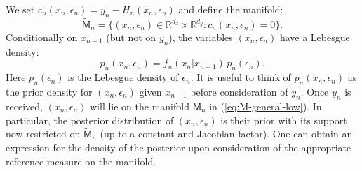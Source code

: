 \documentclass[english,13pt]{article}
\numberwithin{equation}{section}
\begin{document}
We set $c_n(x_n,\epsilon_n) = y_n-H_n(x_n,\epsilon_n)$ and define the manifold:
% 
\begin{equation}
\label{eq:M-general-low}
 \widetilde{\mathsf{M}}_n=\{(x_n,\epsilon_n)\in\mathbb{R}^{d_x}\times\mathbb{R}^{d_y}:
c_n(x_n,\epsilon_n) = 0\} .
\end{equation}
%
Conditionally on $x_{n-1}$ (but not on $y_n$), the variables $(x_n,\epsilon_n)$ have a Lebesgue density: 
%
\begin{equation*}
p_n(x_{n}, \epsilon_n)  = f_n(x_n|x_{n-1})\,p_n(\epsilon_n) .
\end{equation*}
% 
Here $p_n(\epsilon_n)$ is the Lebesgue density of $\epsilon_n$.
It is useful to think  of $p_n(x_n,\epsilon_n)$ as the prior density for $(x_n, \epsilon_n)$ given $x_{n-1}$ before consideration of $y_n$.  Once $y_n$ is received, $(x_n,\epsilon_n)$ will lie on the manifold  $\widetilde{\mathsf{M}}_n$ in (\ref{eq:M-general-low}). In particular, the posterior distribution of $(x_n,\epsilon_n)$ is their prior with its support now restricted on  $\widetilde{\mathsf{M}}_n$ (up-to a constant and Jacobian factor). One can obtain an expression for the density of the posterior upon consideration of the appropriate reference measure on the manifold.  
\end{document}
